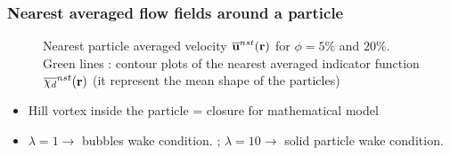 \documentclass{sintefbeamer}
\begin{document}
\begin{frame}
  \frametitle{Nearest averaged flow fields around a particle}
\begin{figure}[h!]
  \centering
  \caption{Nearest particle averaged velocity $\overline{\textbf{u}}^{nst}(\textbf{r})$ for  $\phi = 5\%$ and $20\%$.
  Green lines : contour plots of the nearest averaged indicator function $\overline{\chi_d}^{nst}(\textbf{r})$ (it represent the mean shape of the particles)}
  \label{fig:Stream}
\end{figure}

\begin{itemize}
  \item Hill vortex inside the particle = closure for mathematical model
  \item $\lambda = 1 \rightarrow$ bubbles wake condition.
  ; $\lambda = 10 \rightarrow$ solid particle wake condition. 
\end{itemize}
\end{frame}
\end{document}

